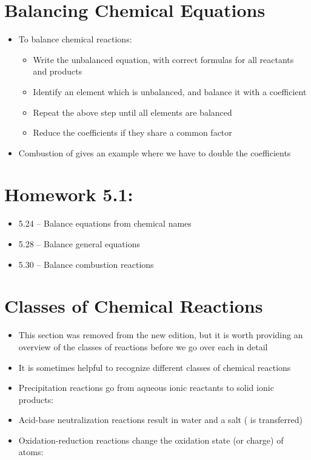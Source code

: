 \documentclass[12pt, openany, letterpaper]{memoir}
\begin{document}
\section{Balancing Chemical Equations}
\begin{itemize}
	\item To balance chemical reactions:
  \begin{itemize}
    \item Write the unbalanced equation, with correct formulas for all reactants and products
    \item Identify an element which is unbalanced, and balance it with a coefficient
    \item Repeat the above step until all elements are balanced
    \item Reduce the coefficients if they share a common factor
  \end{itemize}
  \item Combustion of  gives an example where we have to double the coefficients
\end{itemize}

\section*{Homework 5.1:}
\begin{itemize}
  \item 5.24 -- Balance equations from chemical names
  \item 5.28 -- Balance general equations
  \item 5.30 -- Balance combustion reactions
\end{itemize}

\section*{Classes of Chemical Reactions}
\begin{itemize}
  \item This section was removed from the new edition, but it is worth providing an overview of the classes of reactions before we go over each in detail
	\item It is sometimes helpful to recognize different classes of chemical reactions
	\item Precipitation reactions go from aqueous ionic reactants to solid ionic products:

      \item Acid-base neutralization reactions result in water and a salt ( is transferred)

	\item Oxidation-reduction reactions change the oxidation state (or charge) of atoms:

\end{itemize}
\end{document}
